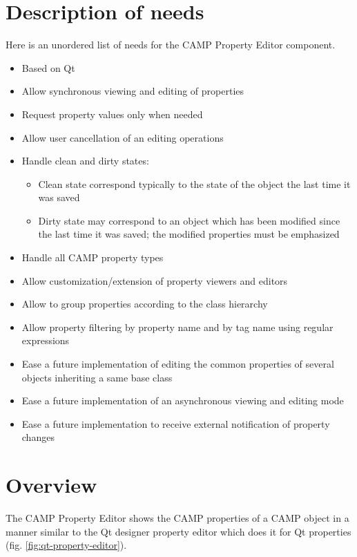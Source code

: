 \documentclass[a4paper, twoside]{report}
\begin{document}
\chapter{Description of needs\label{sec:needs}}

Here is an unordered list of needs for the CAMP Property Editor component.

\begin{itemize}
    \item Based on Qt
    \item Allow synchronous viewing and editing of properties
    \item Request property values only when needed
    \item Allow user cancellation of an editing operations
    \item Handle clean and dirty states:
    \begin{itemize}
        \item Clean state correspond typically to the state of the object the last time it was saved
        \item Dirty state may correspond to an object which has been modified since the last time it was
saved; the modified properties must be emphasized
    \end{itemize}
    \item Handle all CAMP property types
    \item Allow customization/extension of property viewers and editors
    \item Allow to group properties according to the class hierarchy
    \item Allow property filtering by property name and by tag name using regular expressions
    \item Ease a future implementation of editing the common properties of several objects inheriting a same base class
    \item Ease a future implementation of an asynchronous viewing and editing mode
    \item Ease a future implementation to receive external notification of property changes
\end{itemize}

\chapter{Overview\label{sec:overview}}

The CAMP Property Editor shows the CAMP properties of a CAMP object in a manner similar to the Qt
designer property editor which does it for Qt properties (fig. \ref{fig:qt-property-editor}).
\end{document}
